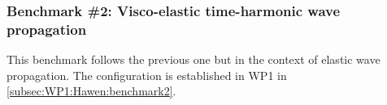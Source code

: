 
\subsubsection{Benchmark \#2: Visco-elastic time-harmonic wave propagation}

This benchmark follows the previous one but in the context of 
elastic wave propagation. The configuration is 
established in WP1 in \cref{subsec:WP1:Hawen:benchmark2}.


